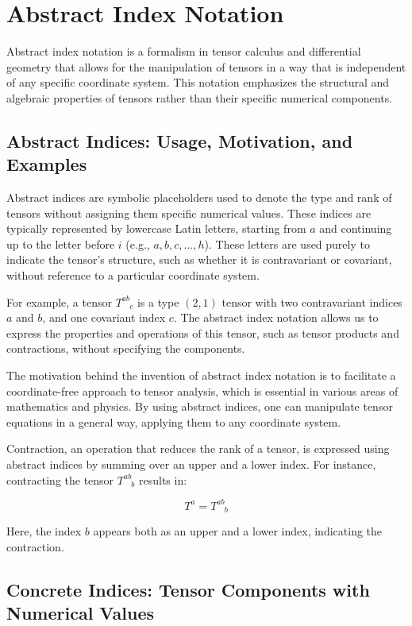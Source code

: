 \documentclass{article}
\begin{document}
\section{Abstract Index Notation}

Abstract index notation is a formalism in tensor calculus and differential geometry that allows for the manipulation of tensors in a way that is independent of any specific coordinate system. This notation emphasizes the structural and algebraic properties of tensors rather than their specific numerical components.

\subsection{Abstract Indices: Usage, Motivation, and Examples}

Abstract indices are symbolic placeholders used to denote the type and rank of tensors without assigning them specific numerical values. These indices are typically represented by lowercase Latin letters, starting from \( a \) and continuing up to the letter before \( i \) (e.g., \( a, b, c, \dots, h \)). These letters are used purely to indicate the tensor’s structure, such as whether it is contravariant or covariant, without reference to a particular coordinate system.

For example, a tensor \( T^{ab}_{\phantom{ab}c} \) is a type \((2,1)\) tensor with two contravariant indices \( a \) and \( b \), and one covariant index \( c \). The abstract index notation allows us to express the properties and operations of this tensor, such as tensor products and contractions, without specifying the components.

The motivation behind the invention of abstract index notation is to facilitate a coordinate-free approach to tensor analysis, which is essential in various areas of mathematics and physics. By using abstract indices, one can manipulate tensor equations in a general way, applying them to any coordinate system.

Contraction, an operation that reduces the rank of a tensor, is expressed using abstract indices by summing over an upper and a lower index. For instance, contracting the tensor \( T^{ab}_{\phantom{ab}b} \) results in:

\[
T^a = T^{ab}_{\phantom{ab}b}
\]

Here, the index \( b \) appears both as an upper and a lower index, indicating the contraction.

\subsection{Concrete Indices: Tensor Components with Numerical Values}
\end{document}
